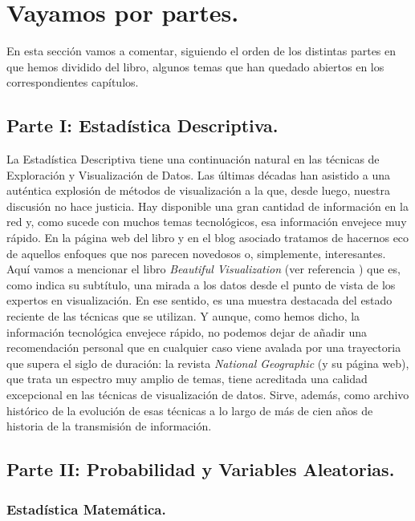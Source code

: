 
\section{Vayamos por partes.}

\noindent En esta sección vamos a comentar, siguiendo el orden de los distintas partes en que hemos dividido del libro, algunos temas que han quedado abiertos en los correspondientes capítulos.

\subsection{Parte I: Estadística Descriptiva.}

La Estadística Descriptiva tiene una continuación natural en las técnicas de Exploración y Visualización de Datos. Las últimas décadas han asistido a una auténtica explosión de métodos de visualización a la que, desde luego, nuestra discusión no hace justicia. Hay disponible una gran cantidad de información en la red y, como sucede con muchos temas tecnológicos, esa información envejece muy rápido. En la página web del libro y en el blog asociado tratamos de hacernos eco de aquellos enfoques que nos parecen novedosos o, simplemente, interesantes. Aquí vamos a mencionar el libro {\em Beautiful Visualization} (ver referencia \cite{steele2010beautiful}) que es, como indica su subtítulo, una mirada a los datos desde el punto de vista de los expertos en visualización. En ese sentido, es una muestra destacada del estado reciente de las técnicas que se utilizan. Y aunque, como hemos dicho, la información tecnológica envejece rápido, no podemos dejar de añadir una recomendación personal que en cualquier caso viene avalada por una trayectoria que supera el siglo de duración: la revista {\em National Geographic} (y su página web), que trata un espectro muy amplio de temas, tiene acreditada una calidad excepcional en las técnicas de visualización de datos. Sirve, además, como archivo histórico de la evolución de esas técnicas a lo largo de más de cien años de historia de la transmisión de información.

\subsection{Parte II: Probabilidad y Variables Aleatorias.}

\subsubsection*{Estadística Matemática.}

